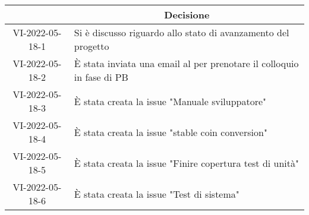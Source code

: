 \begin{table}[H]
	\centering
	\renewcommand{\arraystretch}{1.8}
	\begin{tabular}{c | p{10cm}}
		\rowcolor[HTML]{125E28}
		\multicolumn{1}{c}{\color[HTML]{FFFFFF} \textbf{ID}} &
		\multicolumn{1}{c}{\color[HTML]{FFFFFF} \textbf{Decisione}} \\
		\hline
		VI-2022-05-18-1 & Si è discusso riguardo allo stato di avanzamento del progetto \\ \hline
		VI-2022-05-18-2 & È stata inviata una email al \commitNameS{} per prenotare il colloquio in fase di PB \\ \hline
		VI-2022-05-18-3 & È stata creata la issue "Manuale sviluppatore" \\ \hline
		VI-2022-05-18-4 & È stata creata la issue "stable coin conversion" \\ \hline
		VI-2022-05-18-5 & È stata creata la issue "Finire copertura test di unità" \\ \hline
		VI-2022-05-18-6 & È stata creata la issue "Test di sistema" \\ \hline
	\end{tabular}
\end{table}